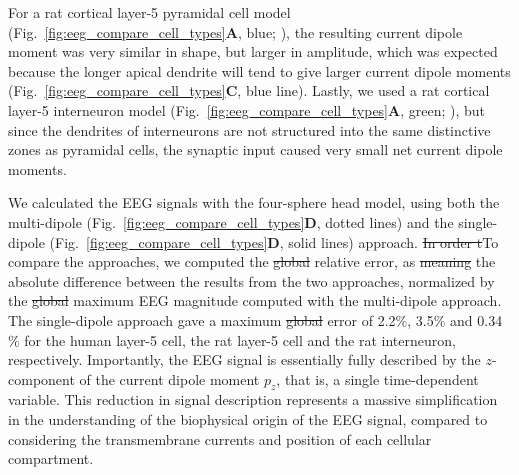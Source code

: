 \documentclass[preprint,10pt,authoryear]{elsarticle}
\newcommand{\hlb}[2][NavyBlue]{ {\sethlcolor{#1} \hl{#2}} }
\newcommand{\hlp}[2][Purple]{ {\sethlcolor{#1} \hl{#2}} }
\newcommand{\snnote}[1]{\color{white}{\hlb{SN: #1 }}\color{black}}
\newcommand{\sntxt}[1]{{\color{NavyBlue}#1}}
\newcommand{\tvntxt}[1]{{\color{Emerald}#1}}
\newcommand{\gen}[1]{\color{white}{\hlp{GTE: #1 }}\color{black}}
\begin{document}
For a rat cortical layer-5 pyramidal cell model (Fig.~\ref{fig:eeg_compare_cell_types}\textbf{A}, blue; \cite{HAY2011}), the resulting current dipole moment was very similar in shape, but larger in amplitude, which was expected because the longer apical dendrite will tend to give larger current dipole moments (Fig.~\ref{fig:eeg_compare_cell_types}\textbf{C}, blue line).
Lastly, we used a rat cortical layer-5 interneuron model (Fig.~\ref{fig:eeg_compare_cell_types}\textbf{A}, green; \cite{MARKRAM2015}), but since the dendrites of interneurons are not structured into the same distinctive zones as pyramidal cells, the synaptic input caused very small net current dipole moments.

We calculated the EEG signals with the four-sphere head model, using both the multi-dipole (Fig.~\ref{fig:eeg_compare_cell_types}\textbf{D}, dotted lines) and the single-dipole (Fig.~\ref{fig:eeg_compare_cell_types}\textbf{D}, solid lines) approach.
\tvntxt{\sout{In order t}To compare the approaches, we computed the \sout{global} relative error, as \sout{meaning} the absolute difference between the results from the two approaches, normalized by the \sout{global} maximum EEG magnitude computed with the multi-dipole approach.}
The single-dipole approach gave a maximum \sout{global}
error of  2.2$\%$, 3.5$\%$ and 0.34$\%$ for the human layer-5 cell, the rat layer-5 cell and the rat interneuron, respectively.
Importantly, the EEG signal is essentially fully described by the $z$-component of the current dipole moment $p_z$, that is, a single time-dependent variable. This reduction in signal description represents a massive simplification in the understanding of the biophysical origin of the EEG signal, compared to considering the transmembrane currents and position of each cellular compartment. 
\end{document}
